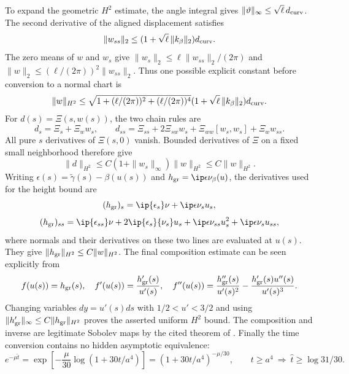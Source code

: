 To expand the geometric $H^2$ estimate, the angle integral gives
$\|\vartheta\|_\infty\le\sqrt\ell\,d_{\rm curv}$. The second derivative
of the aligned displacement satisfies
\[
 \|w_{ss}\|_2\le(1+\sqrt\ell\,\|k_\beta\|_2)d_{\rm curv}.
\]
The zero means of $w$ and $w_s$ give
$\|w_s\|_2\le\ell\|w_{ss}\|_2/(2\pi)$ and
$\|w\|_2\le(\ell/(2\pi))^2\|w_{ss}\|_2$. Thus one possible explicit
constant before conversion to a normal chart is
\[
 \|w\|_{H^2}\le
 \sqrt{1+(\ell/(2\pi))^2+(\ell/(2\pi))^4}
 (1+\sqrt\ell\,\|k_\beta\|_2)d_{\rm curv}.
\]
For $d(s)=\Xi(s,w(s))$, the two chain rules are
\[
 d_s=\Xi_s+\Xi_w w_s,\qquad
 d_{ss}=\Xi_{ss}+2\Xi_{sw}w_s+\Xi_{ww}[w_s,w_s]+\Xi_w w_{ss}.
\]
All pure $s$ derivatives of $\Xi(s,0)$ vanish. Bounded derivatives of $\Xi$
on a fixed small neighborhood therefore give
\[
 \|d\|_{H^2}\le C(1+\|w_s\|_\infty)\|w\|_{H^2}
 \le C\|w\|_{H^2}.
\]
Writing $\epsilon(s)=\widetilde\gamma(s)-\beta(u(s))$ and
$h_{\rm gr}=\ip\epsilon{\nu_\beta(u)}$, the derivatives used for the
height bound are
\[
 (h_{\rm gr})_s=\ip{\epsilon_s}\nu+\ip\epsilon{\nu_s}u_s,
\]
\[
 (h_{\rm gr})_{ss}=\ip{\epsilon_{ss}}\nu
   +2\ip{\epsilon_s}{\nu_s}u_s
   +\ip\epsilon{\nu_{ss}}u_s^2+\ip\epsilon{\nu_s}u_{ss},
\]
where normals and their derivatives on these two lines are evaluated at $u(s)$.
They give $\|h_{\rm gr}\|_{H^2}\le C\|w\|_{H^2}$.
The final composition estimate can be seen explicitly from
\[
 f(u(s))=h_{\rm gr}(s),\quad
 f'(u(s))=\frac{h_{\rm gr}'(s)}{u'(s)},\quad
 f''(u(s))=\frac{h_{\rm gr}''(s)}{u'(s)^2}
       -\frac{h_{\rm gr}'(s)u''(s)}{u'(s)^3}.
\]
Changing variables $dy=u'(s)ds$ with $1/2<u'<3/2$ and using
$\|h_{\rm gr}'\|_\infty\le C\|h_{\rm gr}\|_{H^2}$ proves the asserted
uniform $H^2$ bound. The composition and inverse are legitimate Sobolev maps
by the cited theorem of \cite{IKT}.
Finally the time conversion contains no hidden asymptotic equivalence:
\[
 e^{-\mu\widehat t}=
 \exp\left[-\frac\mu{30}\log(1+30t/a^4)\right]
 =(1+30t/a^4)^{-\mu/30},\qquad
 t\ge a^4\ \Longrightarrow\ \widehat t\ge\log31/30.
\]
